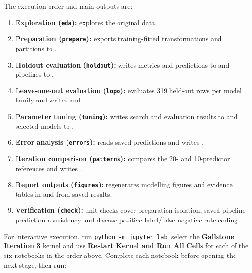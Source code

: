The execution order and main outputs are:

\begin{enumerate}[leftmargin=*]
  \item \textbf{Exploration (\texttt{eda}):}
   explores the original data.
  \item \textbf{Preparation (\texttt{prepare}):}
   exports
  training-fitted transformations and partitions to .
  \item \textbf{Holdout evaluation (\texttt{holdout}):}
   writes metrics and predictions to
   and pipelines to .
  \item \textbf{Leave-one-out evaluation (\texttt{lopo}):}
   evaluates 319 held-out rows
  per model family and writes  and .
  \item \textbf{Parameter tuning (\texttt{tuning}):}
   writes search and evaluation results
  to  and selected models to .
  \item \textbf{Error analysis (\texttt{errors}):}
   reads saved predictions and writes
  .
  \item \textbf{Iteration comparison (\texttt{patterns}):}
   compares the 20- and
  10-predictor references and writes .
  \item \textbf{Report outputs (\texttt{figures}):}
   regenerates modelling figures
  and evidence tables in  and
   from saved results.
  \item \textbf{Verification (\texttt{check}):} unit checks cover preparation
  isolation, saved-pipeline prediction consistency and disease-positive
  label/false-negative-rate coding.
\end{enumerate}

For interactive execution, run \texttt{python -m jupyter lab}, select the
\textbf{Gallstone Iteration 3} kernel and use \textbf{Restart Kernel and Run
All Cells} for each of the six notebooks in the order above. Complete each
notebook before opening the next stage, then run:

